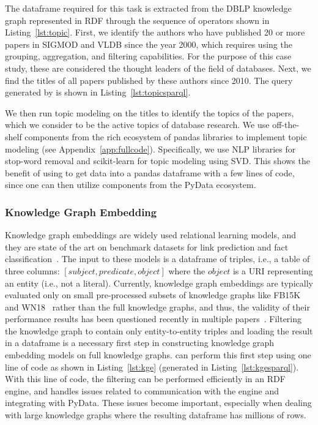 The dataframe required for this task is extracted from the DBLP knowledge graph represented in RDF through the sequence of \rdfframes operators shown in Listing~\ref{lst:topic}.
First, we identify the authors who have published 20 or more papers in SIGMOD and VLDB since the year 2000,
which requires using the \rdfframes grouping, aggregation, and filtering capabilities.
For the purpose of this case study, these are considered the thought leaders
of the field of databases.
Next, we find the titles of all papers published by these authors since 2010.
The \sparql query generated by \rdfframes is shown in Listing~\ref{lst:topicsparql}.

We then run topic modeling on the titles to identify the topics of the papers,
which we consider to be the active topics of database research.
We use off-the-shelf components from the rich ecosystem of pandas libraries to implement topic modeling (see Appendix~\ref{app:fullcode}). Specifically, we use NLP libraries for stop-word removal and scikit-learn for topic modeling using SVD.
This shows the benefit of using \rdfframes to get data into a pandas dataframe with a few lines of code,
since one can then utilize components from the PyData ecosystem.

\subsubsection{Knowledge Graph Embedding}
\label{subsec:kgembedding}
\vspace*{-10pt}
Knowledge graph embeddings 
are widely used
relational learning models,
and they are state of the art on
benchmark datasets for link prediction and fact classification~\cite{journals/tkde/WangMWG17, wang2018multi}.
The input to these models is a dataframe of triples, i.e., a table of three columns: $[subject, predicate, object]$ where the $object$ is a URI representing an entity (i.e., not a literal).
Currently, knowledge graph embeddings are typically evaluated only on small pre-processed subsets of knowledge graphs like FB15K~\cite{bordes2013transe} and WN18~\cite{bordes2013transe} rather than the full knowledge graphs, and thus, the validity of their performance results has been questioned recently in multiple papers~\cite{pujara2017sparsity, dettmers2018convolutional}. 
Filtering the knowledge graph to contain only entity-to-entity triples and loading the result in a dataframe is a necessary first step in constructing knowledge graph embedding models on full knowledge graphs.
\rdfframes can perform this first step using one line of code as shown in Listing~\ref{lst:kge} (generated \sparql in Listing~\ref{lst:kgesparql}).
With this line of code, the filtering can be performed efficiently in an RDF engine, and
\rdfframes handles issues related to communication with the engine and integrating with PyData. These issues become important, especially when 
dealing with large knowledge graphs where
the resulting dataframe has millions of rows.

